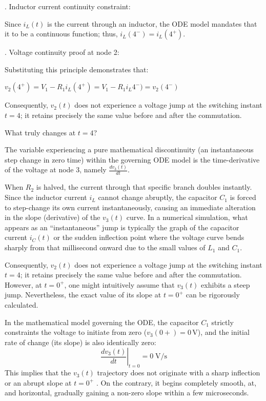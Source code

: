 \documentclass[11pt, a4paper]{article}
\begin{document}
\medskip{}. Inductor current continuity constraint:

Since $i_L (t)$ is the current through an inductor, the ODE model mandates that it to be a continuous function; thus, $i_L (4^-) = i_L (4^+)$.

\medskip{}. Voltage continuity proof at node 2:

Substituting this principle demonstrates that:\\
\centerline{${v_2(4^+) = V_1 - R_1  i_L(4^+) = V_1 - R_1 i_L 4^-) = v_2 (4^-)}$}

Consequently, $v_2 (t)$ does not experience a voltage jump at the switching instant $t = 4$; it retains precisely the same value before and after the commutation.

What truly changes at $t = 4$?

The variable experiencing a pure mathematical discontinuity (an instantaneous step change in zero time) within the governing ODE model is the time-derivative of the voltage at node 3, namely $\frac{dv_3(t)}{dt}$.

When $R_2$ is halved, the current through that specific branch doubles instantly. Since the inductor current $i_L$ cannot change abruptly, the capacitor $C_1$ is forced to step-change its own current instantaneously, causing an immediate alteration in the slope (derivative) of the $v_3(t)$ curve. In a numerical simulation, what appears as an ``instantaneous'' jump is typically the graph of the capacitor current $i_C (t)$ or the sudden inflection point where the voltage curve bends sharply from that millisecond onward due to the small values of $L_1$ and $C_1$.


Consequently, $v_2(t)$ does not experience a voltage jump at the switching instant $t = 4$; it retains precisely the same value before and after the commutation. However, at $t = 0^+$, one might intuitively assume that $v_3(t)$ exhibits a steep jump. Nevertheless, the exact value of its slope at $t = 0^+$ can be rigorously calculated.

In the mathematical model governing the ODE, the capacitor $C_1$ strictly constraints the voltage to initiate from zero ($v_3 (0+ ) = 0$\,V), and the initial rate of change (its slope)
is also identically zero:
\[
\left.\frac{dv_3 (t)}{dt}\right|_{t=0} = 0\; \mathrm{V/s}
\]
This implies that the $v_3(t)$ trajectory does not originate with a sharp inflection or an abrupt slope at $t = 0^+$ . On the contrary, it begins completely smooth, at, and horizontal, gradually gaining a non-zero slope within a few microseconds.
\end{document}
